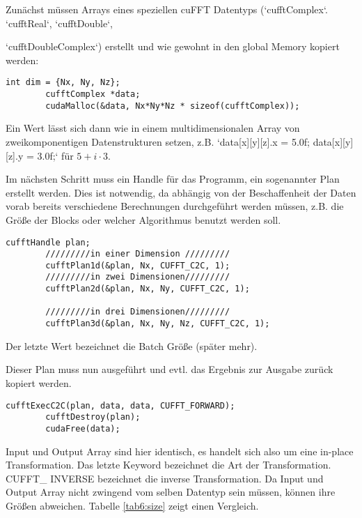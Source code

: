 		Zunächst müssen Arrays eines speziellen cuFFT Datentyps (\li`cufftComplex`. \li`cufftReal`, \li`cufftDouble`, 
		
		\li`cufftDoubleComplex`) erstellt und wie gewohnt in den \gls{global Memory} kopiert werden:
		
		\begin{lstlisting}[caption=cuFFT: komplexer Datentyp]
		int dim = {Nx, Ny, Nz};
		cufftComplex *data;
		cudaMalloc(&data, Nx*Ny*Nz * sizeof(cufftComplex));
		\end{lstlisting}
		
		Ein Wert lässt sich dann wie in einem multidimensionalen Array von zweikomponentigen Datenstrukturen setzen, z.B. \li`data[x][y][z].x = 5.0f; data[x][y][z].y = 3.0f;` für $5 + i\cdot 3$.
	
		Im nächsten Schritt muss ein \Gls{Handle} für das Programm, ein sogenannter Plan erstellt werden. Dies ist notwendig, da abhängig von der Beschaffenheit der Daten vorab bereits verschiedene Berechnungen durchgeführt werden müssen, z.B. die Größe der \Glspl{Block} oder welcher Algorithmus benutzt werden soll. 
		
		\begin{lstlisting}[caption=cuFFT: Pläne]
		cufftHandle plan;
		/////////in einer Dimension /////////
		cufftPlan1d(&plan, Nx, CUFFT_C2C, 1);	
		/////////in zwei Dimensionen/////////
		cufftPlan2d(&plan, Nx, Ny, CUFFT_C2C, 1);	
						
		/////////in drei Dimensionen/////////
		cufftPlan3d(&plan, Nx, Ny, Nz, CUFFT_C2C, 1);
		\end{lstlisting}
		
		Der letzte Wert bezeichnet die Batch Größe (später mehr).
	
	    \newpage
	    
		Dieser Plan muss nun ausgeführt und evtl. das Ergebnis zur Ausgabe zurück kopiert werden.
		
		\begin{lstlisting}[caption=cuFFT: Ausführen]
		cufftExecC2C(plan, data, data, CUFFT_FORWARD);
		cufftDestroy(plan);
		cudaFree(data);
		\end{lstlisting}
		
		Input und Output Array sind hier identisch, es handelt sich also um eine in-place Transformation. Das letzte Keyword bezeichnet die Art der Transformation. CUFFT\_ INVERSE bezeichnet die inverse Transformation. Da Input und Output Array nicht zwingend vom selben Datentyp sein müssen, können ihre Größen abweichen. Tabelle \ref{tab6:size} zeigt einen Vergleich.
		
